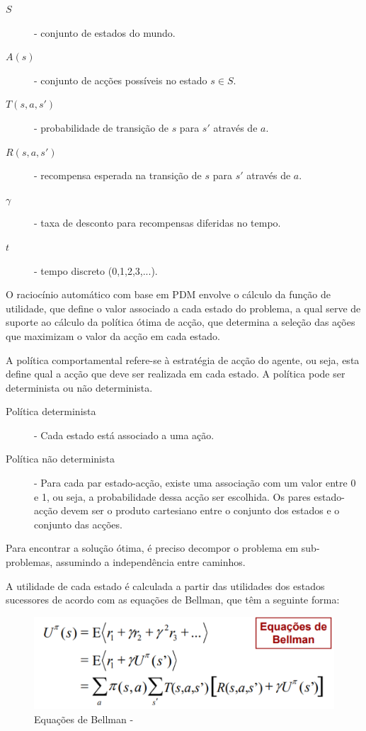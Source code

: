 \documentclass[a4paper,12pt]{article}
\begin{document}
\begin{description}
	\item[\(S\)] - conjunto de estados do mundo.
	\item[\(A(s)\)] - conjunto de acções possíveis no estado \(s \in S\).
	\item[\(T(s,a,s')\)] - probabilidade de transição de \(s\) para \(s'\) através de \(a\).
	\item[\(R(s,a,s')\)] - recompensa esperada na transição de \(s\) para \(s'\) através de \(a\).
	\item[\(\gamma\)] - taxa de desconto para recompensas diferidas no tempo.
	\item[\(t\)] - tempo discreto (0,1,2,3,...).
\end{description}

O raciocínio automático com base em PDM envolve o cálculo da função de utilidade, que define o valor associado a cada estado do problema, a qual serve de suporte ao cálculo da política ótima de acção, que determina a seleção das ações que maximizam o valor da acção em cada estado.

A política comportamental refere-se à estratégia de acção do agente, ou seja, esta define qual a acção que deve ser realizada em cada estado. A política pode ser determinista ou não determinista.
\begin{description}
	\item[Política determinista] - Cada estado está associado a uma ação.
	\item[Política não determinista] - Para cada par estado-acção, existe uma associação com um valor entre 0 e 1, ou seja, a probabilidade dessa acção ser escolhida. Os pares estado-acção devem ser o produto cartesiano entre o conjunto dos estados e o conjunto das acções.
\end{description}

Para encontrar a solução ótima, é preciso decompor o problema em sub-problemas, assumindo a independência entre caminhos.

A utilidade de cada estado é calculada a partir das utilidades dos estados sucessores de acordo com as equações de Bellman, que têm a seguinte forma:
\begin{figure}[h]
\centering
\includegraphics[width=\textwidth]{bellman_equations}
\caption{Equações de Bellman - \cite{pds}}
\end{figure}
\end{document}

